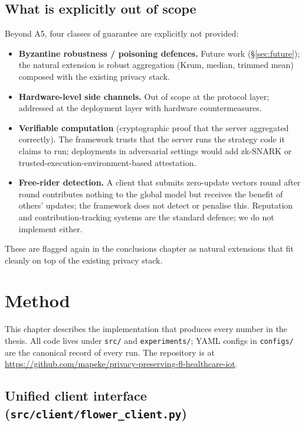 \documentclass[11pt,a4paper]{report}
\begin{document}
\section{What is explicitly out of scope}

Beyond A5, four classes of guarantee are explicitly not provided:

\begin{itemize}[leftmargin=*]
  \item \textbf{Byzantine robustness / poisoning defences.} Future work
  (\S\ref{sec:future}); the natural extension is robust aggregation
  (Krum, median, trimmed mean) composed with the existing privacy stack.
  \item \textbf{Hardware-level side channels.} Out of scope at the protocol
  layer; addressed at the deployment layer with hardware countermeasures.
  \item \textbf{Verifiable computation} (cryptographic proof that the
  server aggregated correctly). The framework trusts that the server runs
  the strategy code it claims to run; deployments in adversarial settings
  would add zk-SNARK or trusted-execution-environment-based attestation.
  \item \textbf{Free-rider detection.} A client that submits zero-update
  vectors round after round contributes nothing to the global model but
  receives the benefit of others' updates; the framework does not detect
  or penalise this. Reputation and contribution-tracking systems are the
  standard defence; we do not implement either.
\end{itemize}

These are flagged again in the conclusions chapter as natural extensions
that fit cleanly on top of the existing privacy stack.

\chapter{Method}\label{ch:method}

This chapter describes the implementation that produces every number in the
thesis. All code lives under \texttt{src/} and \texttt{experiments/}; YAML
configs in \texttt{configs/} are the canonical record of every run. The
repository is at
\url{https://github.com/mapeke/privacy-preserving-fl-healthcare-iot}.

\section{Unified client interface (\texttt{src/client/flower\_client.py})}
\end{document}
